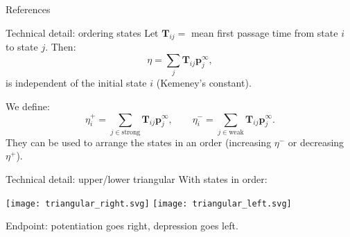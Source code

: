 \documentclass{beamer}%
\newcommand{\pr}{\mathbf{p}}
\newcommand{\eq}{\pr^\infty}
\newcommand{\fpt}{\mathbf{T}}
\begin{document}
\appendix

\begin{frame}[allowframebreaks]{References}
%

 {\small
 
 
 }
%
\end{frame}


\begin{frame}[label=fr_tech]{Technical detail: ordering states}
%
 Let $\fpt_{ij}=$ mean first passage time from state $i$ to state $j$.
 Then:
 \begin{equation*}
   \eta = \sum_j \fpt_{ij} \eq_j,
 \end{equation*}
 is independent of the initial state $i$
 (Kemeney's constant).\\ 

 \vp We define:
 \begin{equation*}
   \eta^+_i = \sum_{j\in\text{strong}} \fpt_{ij} \eq_j,
   \qquad
   \eta^-_i = \sum_{j\in\text{weak}} \fpt_{ij} \eq_j.
 \end{equation*}
 They can be used to arrange the states in an order (increasing $\eta^-$ or decreasing $\eta^+$).
 \hyperlink{fr_areaproof}{}
%
\end{frame}


\begin{frame}{Technical detail: upper/lower triangular}
%
 With states in order:
 \begin{center}
   \texttt{[image: triangular\_right.svg]}
   \hp \hp \hp
   \texttt{[image: triangular\_left.svg]}
 \end{center}
 Endpoint: potentiation goes right, depression goes left.

 \hyperlink{fr_areaproof}{}
%
\end{frame}


\end{document}
